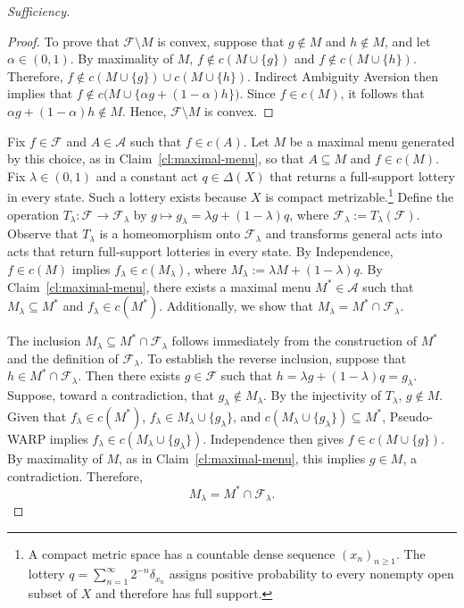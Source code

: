 \documentclass[11pt]{article}
\begin{document}
\begin{proof}[Sufficiency]
\begin{proof}
To prove that $\mathcal{F}\setminus M$ is convex, suppose that
$g\notin M$ and $h\notin M$, and let $\alpha\in(0,1)$.
By maximality of $M$, $f\notin c(M\cup\{g\})$ and
$f\notin c(M\cup\{h\})$. Therefore,
$f\notin c(M\cup\{g\})\cup c(M\cup\{h\})$.
Indirect Ambiguity Aversion then implies that
$f\notin c\bigl(M\cup\{\alpha g+(1-\alpha)h\}\bigr)$.
Since $f\in c(M)$, it follows that
$\alpha g+(1-\alpha)h\notin M$.
Hence, $\mathcal{F}\setminus M$ is convex.
\end{proof}

Fix $f\in\mathcal{F}$ and $A\in\mathcal{A}$ such that $f\in c(A)$.
Let $M$ be a maximal menu generated by this choice, as in
Claim~\ref{cl:maximal-menu}, so that $A\subseteq M$ and $f\in c(M)$.
Fix $\lambda\in(0,1)$ and a constant act $q\in\Delta(X)$ that returns a
full-support lottery in every state. Such a lottery exists because $X$
is compact metrizable.\footnote{A compact metric space has a countable
 dense sequence $(x_n)_{n\geq1}$. The lottery
 $q=\sum_{n=1}^{\infty}2^{-n}\delta_{x_n}$ assigns positive probability
 to every nonempty open subset of $X$ and therefore has full support.}
Define the operation $T_\lambda\colon\mathcal{F}\to\mathcal{F}_\lambda$
by $g\mapsto g_\lambda=\lambda g+(1-\lambda)q$, where
$\mathcal{F}_\lambda:=T_\lambda(\mathcal{F})$.
Observe that $T_\lambda$ is a homeomorphism onto $\mathcal{F}_\lambda$
and transforms general acts into acts that return full-support lotteries
in every state.
By Independence, $f\in c(M)$ implies $f_\lambda\in c(M_\lambda)$,
where $M_\lambda:=\lambda M+(1-\lambda)q$.
By Claim~\ref{cl:maximal-menu}, there exists a maximal menu
$M^*\in\mathcal{A}$ such that $M_\lambda\subseteq M^*$ and
$f_\lambda\in c(M^*)$. Additionally, we show that
$M_\lambda=M^*\cap\mathcal{F}_\lambda$.

The inclusion $M_\lambda\subseteq M^*\cap\mathcal{F}_\lambda$ follows
immediately from the construction of $M^*$ and the definition of
$\mathcal{F}_\lambda$. To establish the reverse inclusion, suppose that
$h\in M^*\cap\mathcal{F}_\lambda$. Then there exists $g\in\mathcal{F}$
such that $h=\lambda g+(1-\lambda)q=g_\lambda$.
Suppose, toward a contradiction, that $g_\lambda\notin M_\lambda$.
By the injectivity of $T_\lambda$, $g\notin M$.
Given that $f_\lambda\in c(M^*)$,
$f_\lambda\in M_\lambda\cup\{g_\lambda\}$, and
$c(M_\lambda\cup\{g_\lambda\})\subseteq M^*$, Pseudo-WARP implies
$f_\lambda\in c(M_\lambda\cup\{g_\lambda\})$.
Independence then gives $f\in c(M\cup\{g\})$.
By maximality of $M$, as in Claim~\ref{cl:maximal-menu}, this implies
$g\in M$, a contradiction. Therefore,
\begin{equation}\label{eq:transformed-maximal-menu}
 M_\lambda=M^*\cap\mathcal{F}_\lambda.
\end{equation}


\end{proof}
\end{document}
